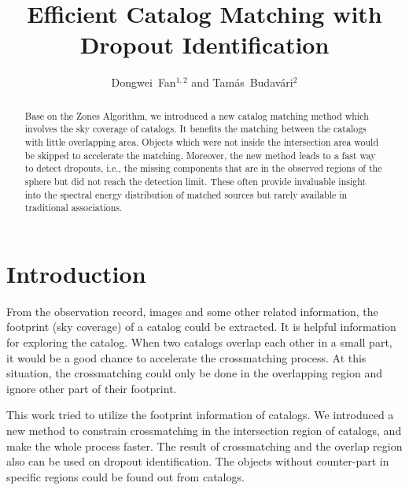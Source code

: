 
\resetcounters



\title{Efficient Catalog Matching with Dropout Identification}
\author{Dongwei~Fan$^{1,2}$ and Tam\'as~Budav\'ari$^2$}


\begin{abstract}
Base on the Zones Algorithm, we introduced a new catalog matching method which involves the sky coverage of catalogs. It benefits the matching between the catalogs with little overlapping area. Objects which were not inside the intersection area would be skipped to accelerate the matching. Moreover, the new method leads to a fast way to detect dropouts, i.e., the missing components that are in the observed regions of the sphere but did not reach the detection limit. These often provide invaluable insight into the spectral energy distribution of matched sources but rarely available in traditional associations.
\end{abstract}

\section{Introduction}
From the observation record, images and some other related information, the footprint (sky coverage) of a catalog could be extracted. It is helpful information for exploring the catalog. When two catalogs overlap each other in a small part, it would be a good chance to accelerate the crossmatching process. At this situation, the crossmatching could only be done in the overlapping region and ignore other part of their footprint.

This work tried to utilize the footprint information of catalogs. We introduced a new method to constrain crossmatching in the intersection region of catalogs, and make the whole process faster. The result of crossmatching and the overlap region also can be used on dropout identification. The objects without counter-part in specific regions could be found out from catalogs.

